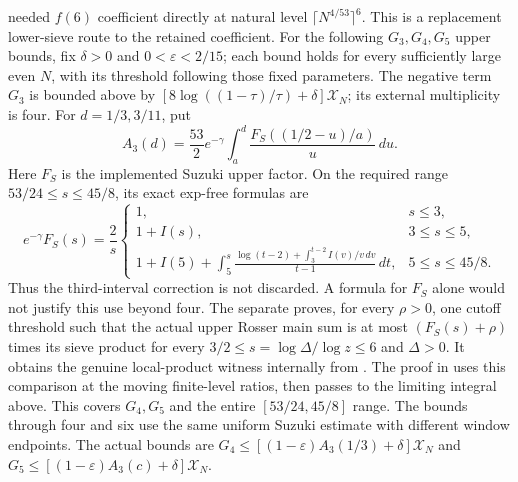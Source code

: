 needed $f(6)$ coefficient directly at natural level $\lceil N^{4/53}\rceil^6$.
This is a replacement lower-sieve route to the retained coefficient.
For the following $G_3,G_4,G_5$ upper bounds, fix $\delta>0$ and
$0<\varepsilon<2/15$; each bound holds for every sufficiently large
even $N$, with its threshold following those fixed parameters.
The negative term $G_3$ is bounded above by
$[8\log((1-\tau)/\tau)+\delta]\mathcal X_N$; its external multiplicity is four.
For $d=1/3,3/11$, put
\[
 A_3(d)=\frac{53}{2}e^{-\gamma}
       \int_a^d\frac{F_S((1/2-u)/a)}u\,du.
\]
Here $F_S$ is the implemented Suzuki upper factor.  On the required
range $53/24\le s\le45/8$, its exact exp-free formulas are
\[
 e^{-\gamma}F_S(s)=\frac2s
 \begin{cases}
 1,&s\le3,\\
 1+I(s),&3\le s\le5,\\
 1+I(5)+\displaystyle\int_5^s
 \frac{\log(t-2)+\int_3^{t-2}I(v)/v\,dv}{t-1}\,dt,&5\le s\le45/8.
 \end{cases}
\]
Thus the third-interval correction is not discarded.  A formula for $F_S$
alone would not justify this use beyond four.  The separate
proves, for every $\rho>0$, one cutoff threshold such that the actual upper
Rosser main sum is at most $(F_S(s)+\rho)$ times its sieve product
for every $3/2\le s=\log\Delta/\log z\le6$ and $\Delta>0$.
It obtains the genuine local-product witness internally from
.
The proof in
uses this comparison at the moving finite-level ratios, then passes to
the limiting integral above. This covers $G_4,G_5$ and the entire
$[53/24,45/8]$ range. The bounds through four and six use the same
uniform Suzuki estimate with different window endpoints.
The actual bounds are $G_4\le[(1-\varepsilon)A_3(1/3)+\delta]\mathcal X_N$
and $G_5\le[(1-\varepsilon)A_3(c)+\delta]\mathcal X_N$.

